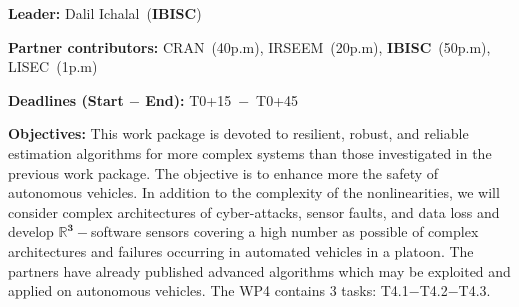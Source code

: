 \documentclass[a4paper,11pt]{article}
\begin{document}
\begin{itemize}[leftmargin=.2in,noitemsep,nolistsep]
\begin{tcolorbox}[breakable, enhanced,  colback=blue!2!white,
title = \bf Contributors$-$Deadlines$-$Objectives, coltitle= black, colbacktitle=green!40!white, halign title=center]
{ \bf {Leader}:} Dalil {\sc Ichalal}~({\bf IBISC})

{ \bf {Partner contributors}:} CRAN~(\textcolor{navyblue}{40p.m}), IRSEEM~(\textcolor{navyblue}{20p.m}), {\bf IBISC}~(\textcolor{navyblue}{50p.m}), LISEC~(\textcolor{navyblue}{1p.m})

{ \bf {Deadlines (Start $-$ End)}:} T0+15~$-$~T0+45

{ \bf {Objectives}:} This work package is devoted to resilient, robust, and reliable estimation algorithms for more complex systems than those investigated in the previous work package. The objective is to enhance more the safety of autonomous vehicles. In addition to the complexity of the nonlinearities, we will consider complex architectures of cyber-attacks, sensor faults, and data loss and develop $\pmb{\mathbb{R}^{3}}-$software sensors covering a high number as possible of complex architectures and failures occurring in automated vehicles in a platoon. The partners have already published advanced algorithms which may be exploited and applied on autonomous vehicles. The WP4 contains 3 tasks: T4.1$-$T4.2$-$T4.3.


\end{tcolorbox}
\end{itemize}
\end{document}
